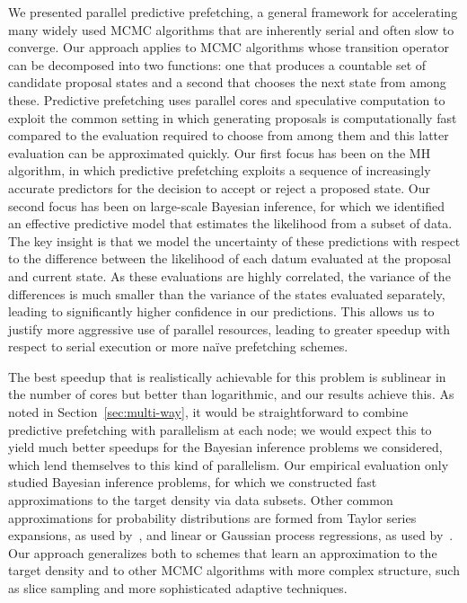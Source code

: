 \documentclass[angelino.tex]{subfiles}
\begin{document}
We presented parallel predictive prefetching, a general framework for accelerating many widely used MCMC algorithms that are inherently serial and often slow to converge.
%
Our approach applies to MCMC algorithms whose transition operator can be decomposed into two functions: one that produces a countable set of candidate proposal states and a second that chooses the next state from among these.
%
Predictive prefetching uses parallel cores and speculative computation to exploit the common setting in which generating proposals is computationally fast compared to the evaluation required to choose from among them and this latter evaluation can be approximated quickly.
%
Our first focus has been on the MH algorithm, in which predictive prefetching exploits a sequence of increasingly accurate predictors for the decision to accept or reject a proposed state.
%
Our second focus has been on large-scale Bayesian inference, for which we identified an effective predictive model that estimates the likelihood from a subset of data.
%
The key insight is that we model the uncertainty of these predictions with respect to the difference between the likelihood of each datum evaluated at the proposal and current state.  
%
As these evaluations are highly correlated, the variance of the differences is much smaller than the variance of the states evaluated separately, leading to significantly higher confidence in our predictions.
%
This allows us to justify more aggressive use of parallel resources, leading to greater speedup with respect to serial execution or more na\"{i}ve prefetching schemes.


The best speedup that is realistically achievable for this problem is sublinear in the number of cores but better than logarithmic, and our results achieve this.
%
As noted in Section~\ref{sec:multi-way}, it would be straightforward to
combine predictive prefetching with parallelism at each node;
we would expect this to yield much better speedups for the Bayesian inference
problems we considered, which lend themselves to this kind of parallelism.
%
Our empirical evaluation only studied Bayesian inference problems, for which
we constructed fast approximations to the target density via data subsets.
%
Other common approximations for probability distributions are formed from
Taylor series expansions, \eg as used by~\citet{christen-fox-2005-approx},
and linear or Gaussian process regressions, \eg as used by~\citep{conrad:2014-local}.
%
Our approach generalizes both to schemes that learn an approximation to the
target density and to other MCMC algorithms with more complex structure,
such as slice sampling and more sophisticated adaptive techniques.
\end{document}
